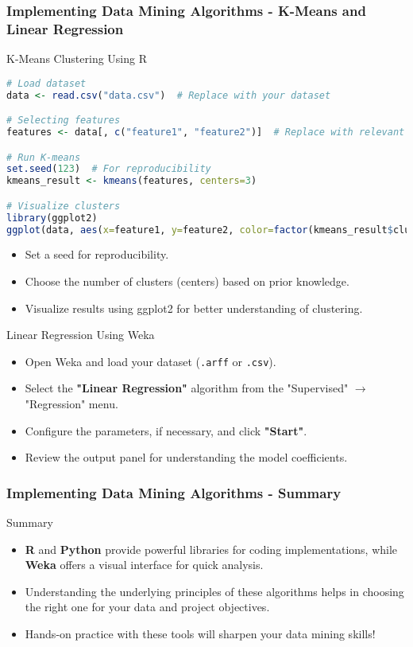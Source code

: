 \documentclass{beamer}
\begin{document}
\begin{frame}[fragile]
    \frametitle{Implementing Data Mining Algorithms - K-Means and Linear Regression}
    \begin{block}{K-Means Clustering Using R}
        \begin{lstlisting}[language=R]
# Load dataset
data <- read.csv("data.csv")  # Replace with your dataset

# Selecting features
features <- data[, c("feature1", "feature2")]  # Replace with relevant features 

# Run K-means
set.seed(123)  # For reproducibility
kmeans_result <- kmeans(features, centers=3)

# Visualize clusters
library(ggplot2)
ggplot(data, aes(x=feature1, y=feature2, color=factor(kmeans_result$cluster))) + geom_point()
        \end{lstlisting}
        \begin{itemize}
            \item Set a seed for reproducibility.
            \item Choose the number of clusters (centers) based on prior knowledge.
            \item Visualize results using ggplot2 for better understanding of clustering.
        \end{itemize}
    \end{block}

    \begin{block}{Linear Regression Using Weka}
        \begin{itemize}
            \item Open Weka and load your dataset (\texttt{.arff} or \texttt{.csv}).
            \item Select the \textbf{"Linear Regression"} algorithm from the "Supervised" $\rightarrow$ "Regression" menu.
            \item Configure the parameters, if necessary, and click \textbf{"Start"}.
            \item Review the output panel for understanding the model coefficients.
        \end{itemize}
    \end{block}
\end{frame}

\begin{frame}
    \frametitle{Implementing Data Mining Algorithms - Summary}
    \begin{block}{Summary}
        \begin{itemize}
            \item \textbf{R} and \textbf{Python} provide powerful libraries for coding implementations, while \textbf{Weka} offers a visual interface for quick analysis.
            \item Understanding the underlying principles of these algorithms helps in choosing the right one for your data and project objectives.
            \item Hands-on practice with these tools will sharpen your data mining skills!
        \end{itemize}
    \end{block}
\end{frame}
\end{document}
